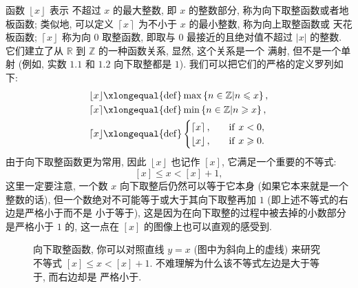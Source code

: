 \documentclass[10pt,UTF8]{book} %
\begin{document}
\begin{example}
    函数 $\left\lfloor x \right\rfloor$ 表示 {\kaishu 不超过 $x$ 的最大整数},
    即 $x$ 的整数部分, 称为向下取整函数或者地板函数; 类似地, 可以定义 
    $\left\lceil x \right\rceil$ 为不小于 $x$ 的最小整数, 称为向上取整函数或
    天花板函数; $\left\lceil x \right\rfloor$ 称为向 $0$ 取整函数, 即取与 $0$
    最接近的且绝对值不超过 $|x|$ 的整数. 
    它们建立了从 $\mathbb{R}$ 到 $\mathbb{Z}$ 的一种函数关系, 显然, 这个关系是一个
    满射, 但不是一个单射 (例如, 实数 $1.1$ 和 $1.2$ 向下取整都是 $1$).
    我们可以把它们的严格的定义罗列如下:
    \begin{align*}
        \left\lfloor x \right\rfloor & \xlongequal{\mathrm{def}} \max \left\{
            n \in \mathbb{Z} | n \leqslant x
        \right\}, \\ 
        \left\lceil x \right\rceil & \xlongequal{\mathrm{def}} \min \left\{
            n \in \mathbb{Z} | n \geqslant x
        \right\}, \\
        \left\lceil x \right\rfloor & \xlongequal{\mathrm{def}} \begin{cases}
            \left\lceil x \right\rceil, \quad &\mathrm{if} \,\, x<0, \\ 
            \left\lfloor x \right\rfloor, \quad &\mathrm{if} \,\, x\geqslant 0.
        \end{cases}
    \end{align*}
    由于向下取整函数更为常用, 因此 $\left\lfloor x \right\rfloor$ 也记作 $[x]$,
    它满足一个重要的不等式:
    \[ \boxed{[x] \leqslant x < [x] + 1}, \]
    这里一定要注意, 一个数 $x$ 向下取整后仍然可以等于它本身 (如果它本来就是一个整数的话),
    但一个数绝对不可能等于或大于其向下取整再加 $1$ (即上述不等式的右边是严格小于而不是
    小于等于), 这是因为在向下取整的过程中被去掉的小数部分是严格小于 $1$ 的, 这一点在
    $[x]$ 的图像上也可以直观的感受到.
\end{example}
\begin{figure}[H]
    \centering
    \caption{向下取整函数, 你可以对照直线 $y=x$ (图中为斜向上的虚线) 来研究不等式
    $[x] \leqslant x < [x]+1$. 不难理解为什么该不等式左边是大于等于, 而右边却是
    严格小于.}
\end{figure}
\end{document}
